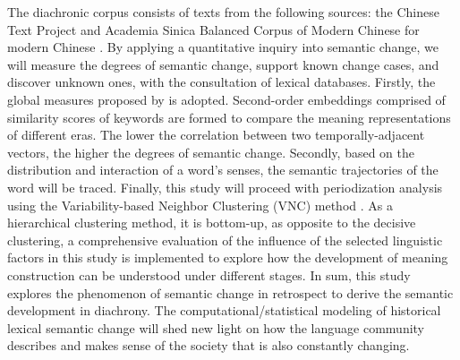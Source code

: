The diachronic corpus consists of texts from the following sources: the Chinese Text Project \parencite{sturgeon2019ctext} and Academia Sinica Balanced Corpus of Modern Chinese for modern Chinese \parencite{chen1996sinica}. By applying a quantitative inquiry into semantic change, we will measure the degrees of semantic change, support known change cases, and discover unknown ones, with the consultation of lexical databases. Firstly, the global measures proposed by \textcite{hamilton2016cultural} is adopted. Second-order embeddings comprised of similarity scores of keywords are formed to compare the meaning representations of different eras. The lower the correlation between two temporally-adjacent vectors, the higher the degrees of semantic change. Secondly, based on the distribution and interaction of a word's senses, the semantic trajectories of the word will be traced. Finally, this study will proceed with periodization analysis using the Variability-based Neighbor Clustering (VNC) method \parencite{gries2012variability}. As a hierarchical clustering method, it is bottom-up, as opposite to the decisive clustering, a comprehensive evaluation of the influence of the selected linguistic factors in this study is implemented to explore how the development of meaning construction can be understood under different stages. In sum, this study explores the phenomenon of semantic change in retrospect to derive the semantic development in diachrony. The computational/statistical modeling of historical lexical semantic change will shed new light on how the language community describes and makes sense of the society that is also constantly changing.


